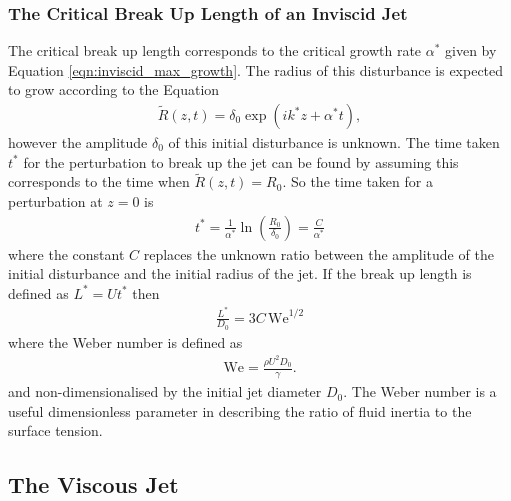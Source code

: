 \documentclass[11pt]{article}
\begin{document}
\subsubsection{The Critical Break Up Length of an Inviscid Jet} \label{sec:breakup_inviscid}
The critical break up length corresponds to the critical growth rate $\alpha^*$ 
given by Equation \ref{eqn:inviscid_max_growth}. The radius of this disturbance 
is expected to grow according to the Equation
\begin{align}
\tilde{R}(z,t) = \delta_0 \exp(ik^*z + \alpha^* t),
\end{align}
however the amplitude $\delta_0$ of this initial disturbance is unknown. The 
time taken $t^*$ for the perturbation to break up the jet can be found by 
assuming this corresponds to the time when $\tilde{R}(z,t) = R_0$. So the time 
taken for a perturbation at $z =0$ is
\begin{align*}
t^* = \frac{1}{\alpha^*} \ln \left( \frac{R_0}{\delta_0} \right) = \frac{C}{\alpha^*}
\end{align*}
where the constant $C$ replaces the unknown ratio between the amplitude of the 
initial disturbance and the initial radius of the jet. If the break up length 
is defined as $L^* = Ut^*$ then
\begin{align}
\frac{L^*}{D_0} = 3 C \, \mathrm{We}^{1/2}
\label{eqn:breakup_inviscid}
\end{align}
where the Weber number is defined as
\begin{align}
\mathrm{We} = \frac{\rho U^2 D_0}{\gamma}.
\end{align}
and non-dimensionalised by the initial jet diameter $D_0$. The Weber number is 
a useful dimensionless parameter in describing the ratio of fluid inertia to 
the surface tension. 

\subsection{The Viscous Jet}
\end{document}
